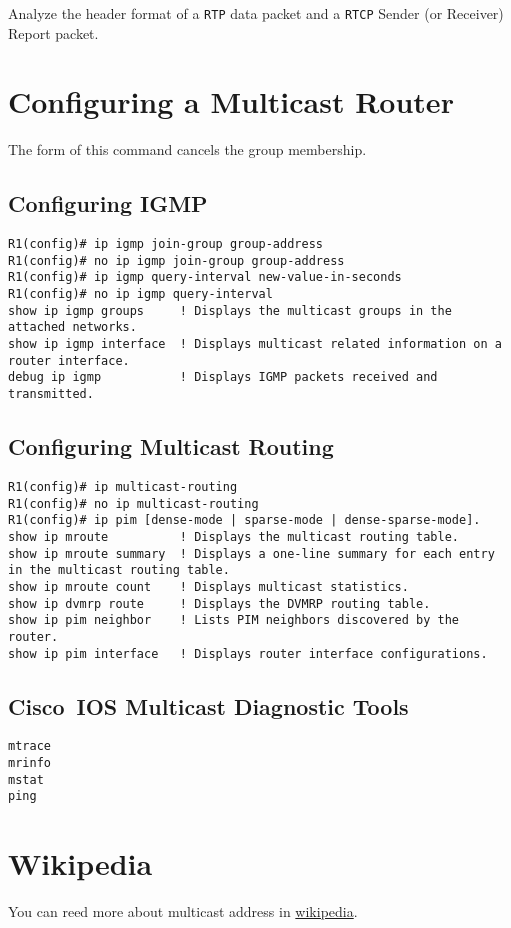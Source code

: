 \documentclass{../UTNetLab}
\begin{document}
Analyze the header format of a \texttt{RTP} data packet and a \texttt{RTCP} Sender (or Receiver) Report packet.


\begin{appendices}

    \section{Configuring a Multicast Router}
    The  form of this command cancels the group membership.
    \begin{subappendices}
        \subsection{Configuring IGMP}
        \begin{lstlisting}[language={cisco}, emph={group-address, new-value-in-seconds}]
R1(config)# ip igmp join-group group-address
R1(config)# no ip igmp join-group group-address
R1(config)# ip igmp query-interval new-value-in-seconds
R1(config)# no ip igmp query-interval
show ip igmp groups     ! Displays the multicast groups in the attached networks.
show ip igmp interface  ! Displays multicast related information on a router interface.
debug ip igmp           ! Displays IGMP packets received and transmitted.
    \end{lstlisting}

        \subsection{Configuring Multicast Routing}
        \begin{lstlisting}[language={cisco}]
R1(config)# ip multicast-routing
R1(config)# no ip multicast-routing
R1(config)# ip pim [dense-mode | sparse-mode | dense-sparse-mode].
show ip mroute          ! Displays the multicast routing table.
show ip mroute summary  ! Displays a one-line summary for each entry in the multicast routing table.
show ip mroute count    ! Displays multicast statistics.
show ip dvmrp route     ! Displays the DVMRP routing table.
show ip pim neighbor    ! Lists PIM neighbors discovered by the router.
show ip pim interface   ! Displays router interface configurations.
    \end{lstlisting}

        \subsection{Cisco~IOS Multicast Diagnostic Tools}
        \begin{lstlisting}[language={cisco}]
mtrace
mrinfo
mstat
ping
\end{lstlisting}

    \end{subappendices}

    \section{Wikipedia}
    You can reed more about multicast address in \href{https://en.wikipedia.org/wiki/Multicast_address}{wikipedia}.

\end{appendices}
\end{document}
